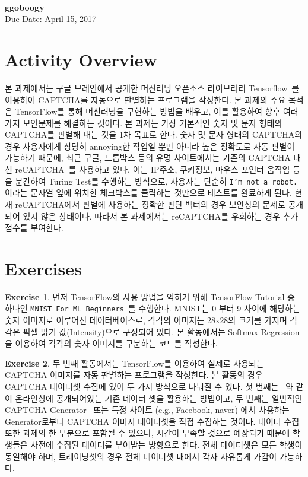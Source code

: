 \documentclass[a4paper, 11pt]{article}
\theoremstyle{definition}
\newtheorem{exercise}{Exercise}
\begin{document}
 \\
         {\phantom{} \hfill \textbf{ggoboogy}} \\
         {\phantom{} \hfill Due Date: April 15, 2017} \\

\section{Activity Overview}
본 과제에서는 구글 브레인에서 공개한 머신러닝 오픈소스 라이브러리 Tensorflow~\cite{tensorflow}를 이용하여 CAPTCHA를 자동으로 판별하는 프로그램을 작성한다. 
본 과제의 주요 목적은 TensorFlow를 통해 머신러닝을 구현하는 방법을 배우고, 이를 활용하여 향후 여러가지 보안문제를 해결하는 것이다. 
본 과제는 가장 기본적인 숫자 및 문자 형태의 CAPTCHA를 판별해 내는 것을 1차 목표로 한다. 
숫자 및 문자 형태의 CAPTCHA의 경우 사용자에게 상당히 annoying한 작업일 뿐만 아니라 높은 정확도로 자동 판별이 가능하기 때문에, 
최근 구글, 드롭박스 등의 유명 사이트에서는 기존의 CAPTCHA 대신 reCAPTCHA~\cite{recaptcha}를 사용하고 있다. 
이는 IP주소, 쿠키정보, 마우스 포인터 움직임 등을 분간하여 Turing Test를 수행하는 방식으로, 
사용자는 단순히 \texttt{I'm not a robot.} 이라는 문자열 옆에 위치한 체크박스를 클릭하는 것만으로 테스트를 완료하게 된다.
현재 reCAPTCHA에서 판별에 사용하는 정확한 판단 벡터의 경우 보안상의 문제로 공개되어 있지 않은 상태이다. 
따라서 본 과제에서는 reCAPTCHA를 우회하는 경우 추가점수를 부여한다. 

\section{Exercises}

\begin{exercise}
먼저 TensorFlow의 사용 방법을 익히기 위해 TensorFlow Tutorial 중 하나인 \texttt{MNIST For ML Beginners}~\cite{tftutorial}를 수행한다. 
MNIST는 0 부터 9 사이에 해당하는 숫자 이미지로 이루어진 데이터베이스로, 
각각의 이미지는 28x28의 크기를 가지며 각각은 픽셀 밝기 값(Intensity)으로 구성되어 있다. 
본 활동에서는 Softmax Regression을 이용하여 각각의 숫자 이미지를 구분하는 코드를 작성한다. 
\end{exercise}

\begin{exercise}
두 번째 활동에서는 TensorFlow를 이용하여 실제로 사용되는 CAPTCHA 이미지를 자동 판별하는 프로그램을 작성한다. 
본 활동의 경우 CAPTCHA 데이터셋 수집에 있어 두 가지 방식으로 나눠질 수 있다. 
첫 번째는 ~\cite{captchaset}와 같이 온라인상에 공개되어있는 기존 데이터 셋을 활용하는 방법이고, 
두 번째는 일반적인 CAPTCHA Generator~\cite{generator1, generator2, generator3} 또는 
특정 사이트 (e.g., Facebook, naver) 에서 사용하는 Generator로부터 CAPTCHA 이미지 데이터셋을 직접 수집하는 것이다.
데이터 수집 또한 과제의 한 부분으로 포함될 수 있으나, 시간이 부족할 것으로 예상되기 때문에 학생들은 사전에 수집된 데이터를 부여받는 방향으로 한다.
전체 데이터셋은 모든 학생이 동일해야 하며, 트레이닝셋의 경우 전체 데이터셋 내에서 각자 자유롭게 가감이 가능하다. 
\end{exercise} 
\end{document}
